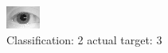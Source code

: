 \begin{figure}[h!]
\begin{center}
\includegraphics[width=0.60\columnwidth]{figures/ID1180_class_2_target_3.png}
\end{center}
\caption{ Classification: 2 actual target: 3}
\label{fig:ID1180_class_2_target_3}
\end{figure}
